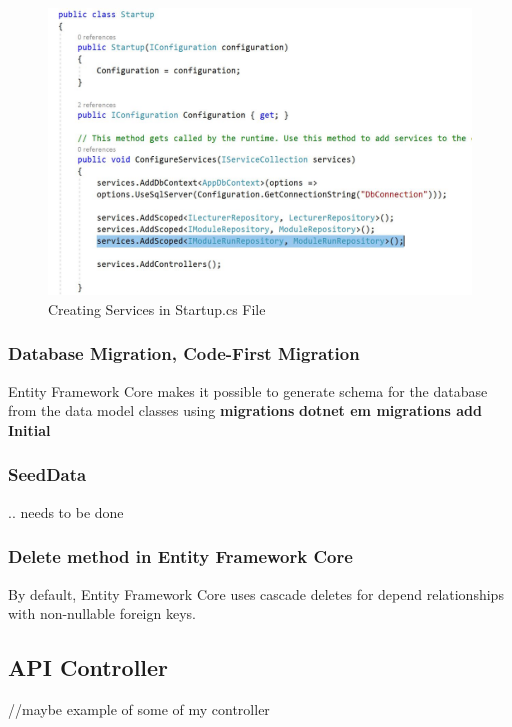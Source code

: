 \documentclass{scrartcl}
\begin{document}
\begin{figure}[h]
\centering
\includegraphics[width=150mm]{report_img/add_scoped_rep.JPG}
\caption{Creating Services in Startup.cs File}
\label{blabla}
\end{figure}

\cite{core3}
\subsubsection{Database Migration, Code-First Migration}
Entity Framework Core makes it possible to generate schema for the database from the data model classes using \textbf{migrations}
\textbf{dotnet em migrations add Initial} 
\cite{core3}

\subsubsection{SeedData}
.. needs to be done

\subsubsection{Delete method in Entity Framework Core}
By default, Entity Framework Core uses cascade deletes for depend relationships with non-nullable foreign keys. \cite{efa}

\subsection{API Controller}

//maybe example of some of my controller




\end{document}
